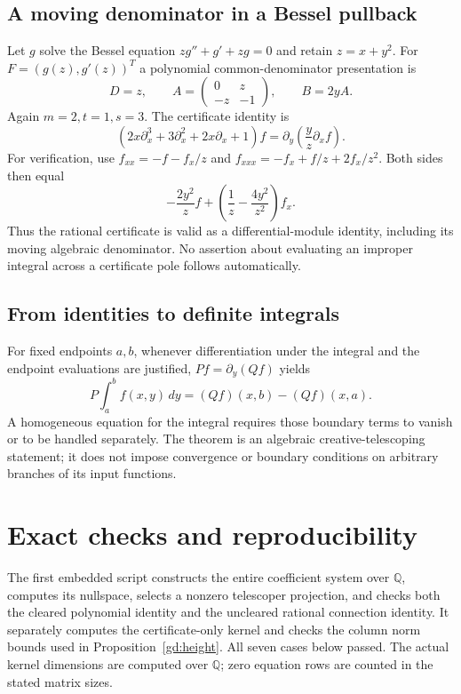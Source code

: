 \subsection{A moving denominator in a Bessel pullback}
Let $g$ solve the Bessel equation $zg''+g'+zg=0$ and retain $z=x+y^2$.
For $F=(g(z),g'(z))^T$ a polynomial common-denominator presentation is
\[
 D=z,\qquad
 A=\begin{pmatrix}0&z\\-z&-1\end{pmatrix},\qquad B=2yA.
\]
Again $m=2,t=1,s=3$. The certificate identity is
\begin{equation}\label{ex:bessel}
 (2x\partial_x^3+3\partial_x^2+2x\partial_x+1)f
   =\partial_y\left(\frac{y}{z}\partial_x f\right).
\end{equation}
For verification, use $f_{xx}=-f-f_x/z$ and
$f_{xxx}=-f_x+f/z+2f_x/z^2$. Both sides then equal
\[
 -\frac{2y^2}{z}f+
 \left(\frac1z-\frac{4y^2}{z^2}\right)f_x.
\]
Thus the rational certificate is valid as a differential-module identity,
including its moving algebraic denominator. No assertion about evaluating
an improper integral across a certificate pole follows automatically.

\subsection{From identities to definite integrals}
For fixed endpoints $a,b$, whenever differentiation under the integral
and the endpoint evaluations are justified, $Pf=\partial_y(Qf)$ yields
\[
 P\int_a^b f(x,y)\,dy=(Qf)(x,b)-(Qf)(x,a).
\]
A homogeneous equation for the integral requires those boundary terms
to vanish or to be handled separately. The theorem is an algebraic
creative-telescoping statement; it does not impose convergence or
boundary conditions on arbitrary branches of its input functions.

\section{Exact checks and reproducibility}
The first embedded script constructs the entire coefficient system over
$\mathbb Q$, computes its nullspace, selects a nonzero telescoper
projection, and checks both the cleared polynomial identity and the
uncleared rational connection identity. It separately computes the
certificate-only kernel and checks the column norm bounds used in
Proposition~\ref{gd:height}. All seven cases below passed.
The actual kernel dimensions are computed over $\mathbb Q$; zero
equation rows are counted in the stated matrix sizes.

